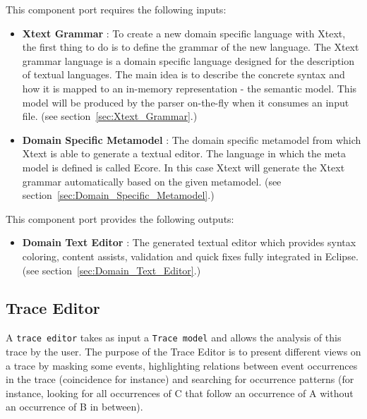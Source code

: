 \documentclass{gemoc} %
\begin{document}
This component port requires the following inputs:
\begin{itemize}
  \item \textbf{Xtext Grammar} :
To create a new domain specific language with Xtext, the first thing to do is to define the grammar of the new language. The Xtext grammar language is a domain specific language designed for the description of textual languages. The main idea is to describe the concrete syntax and how it is mapped to an in-memory representation - the semantic model. This model will be produced by the parser on-the-fly when it consumes an input file.
(see section~\ref{sec:Xtext_Grammar}.)
  \item \textbf{Domain Specific Metamodel} :
The domain specific metamodel from which Xtext is able to generate a textual editor. The language in which the meta model is defined is called Ecore. In this case Xtext will generate the Xtext grammar automatically based on the given metamodel.
(see section~\ref{sec:Domain_Specific_Metamodel}.)
\end{itemize}

This component port provides the following outputs:
\begin{itemize}
  \item \textbf{Domain Text Editor} :
The generated textual editor which provides syntax coloring, content assists, validation and quick fixes fully integrated in Eclipse.
(see section~\ref{sec:Domain_Text_Editor}.)
\end{itemize}




\subsection{Trace Editor}
\label{sec:Trace_Editor}
A \texttt{trace editor} takes as input a \texttt{Trace model} and allows the analysis of this trace by the user.
The purpose of the Trace Editor is to present different views on a trace by masking some events, highlighting relations between event occurrences in the trace (coincidence for instance) and searching for occurrence patterns (for instance, looking for all occurrences of C that follow an occurrence of A without an occurrence of B in between).
 
\end{document}
